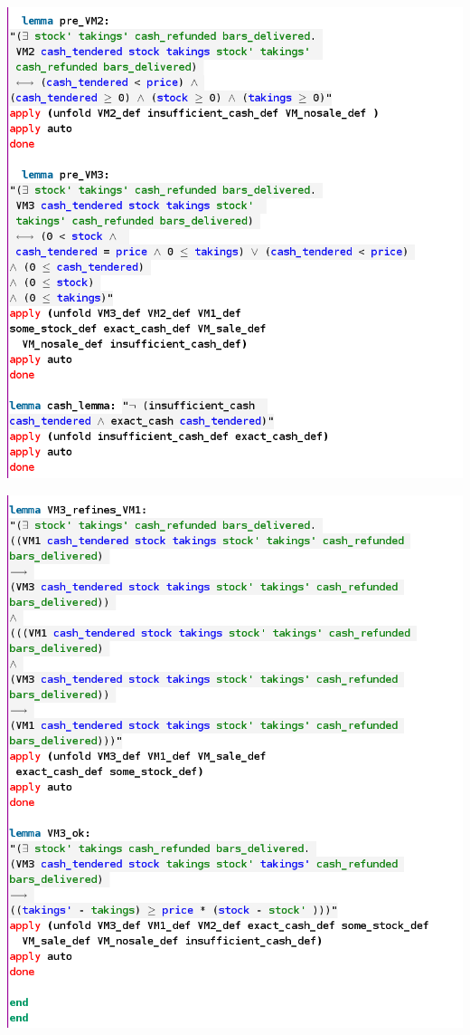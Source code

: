 \noindent \includegraphics[scale=0.5]{examples/vm/6imaged.png}

\noindent \includegraphics[scale=0.5]{examples/vm/6imagee.png}
%

